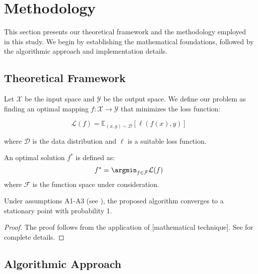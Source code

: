 \section{Methodology}
\label{sec:methodology}

This section presents our theoretical framework and the methodology employed in this study. We begin by establishing the mathematical foundations, followed by the algorithmic approach and implementation details.

\subsection{Theoretical Framework}
\label{subsec:theory}

Let $\mathcal{X}$ be the input space and $\mathcal{Y}$ be the output space. We define our problem as finding an optimal mapping $f: \mathcal{X} \rightarrow \mathcal{Y}$ that minimizes the loss function:

\begin{equation}
\label{eq:loss_function}
\mathcal{L}(f) = \mathbb{E}_{(x,y) \sim \mathcal{D}} \left[ \ell(f(x), y) \right]
\end{equation}

where $\mathcal{D}$ is the data distribution and $\ell$ is a suitable loss function.

\begin{definition}
\label{def:optimal_solution}
An optimal solution $f^*$ is defined as:
\begin{equation}
f^* = \argmin_{f \in \mathcal{F}} \mathcal{L}(f)
\end{equation}
where $\mathcal{F}$ is the function space under consideration.
\end{definition}

\begin{theorem}
\label{thm:convergence}
Under assumptions A1-A3 (see ), the proposed algorithm converges to a stationary point with probability 1.
\end{theorem}

\begin{proof}
The proof follows from the application of [mathematical technique]. See  for complete details.
\end{proof}

\subsection{Algorithmic Approach}
\label{subsec:algorithm}

